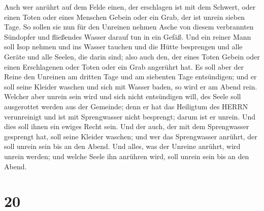 Auch wer anrührt auf dem Felde einen, der erschlagen ist mit dem
Schwert, oder einen Toten oder eines Menschen Gebein oder ein Grab, der
ist unrein sieben Tage.  So sollen sie nun für den Unreinen
nehmen Asche von diesem verbrannten Sündopfer und fließendes Wasser
darauf tun in ein Gefäß.  Und ein reiner Mann soll Isop
nehmen und ins Wasser tauchen und die Hütte besprengen und alle Geräte
und alle Seelen, die darin sind; also auch den, der eines Toten Gebein
oder einen Erschlagenen oder Toten oder ein Grab angerührt hat.
 Es soll aber der Reine den Unreinen am dritten Tage und am
siebenten Tage entsündigen; und er soll seine Kleider waschen und sich
mit Wasser baden, so wird er am Abend rein.  Welcher aber
unrein sein wird und sich nicht entsündigen will, des Seele soll
ausgerottet werden aus der Gemeinde; denn er hat das Heiligtum des HERRN
verunreinigt und ist mit Sprengwasser nicht besprengt; darum ist er
unrein.  Und dies soll ihnen ein ewiges Recht sein. Und der
auch, der mit dem Sprengwasser gesprengt hat, soll seine Kleider
waschen; und wer das Sprengwasser anrührt, der soll unrein sein bis an
den Abend.  Und alles, was der Unreine anrührt, wird unrein
werden; und welche Seele ihn anrühren wird, soll unrein sein bis an den
Abend.

\hypertarget{section-19}{%
\section{20}\label{section-19}}

